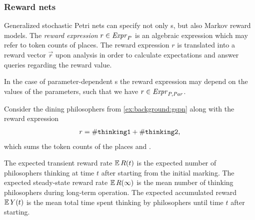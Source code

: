 \subsubsection{Reward nets}

Generalized stochastic Petri nets can specify not only s, but also Markov reward models. The \emph{reward expression} \(r \in \textrm{\itshape Expr\/}_P\) is an algebraic expression which may refer to token counts of places. The reward expression \(r\) is translated into a reward vector \(\vec{r}\) upon analysis in order to calculate expectations and answer queries regarding the reward value.

In the case of parameter-dependent s the reward expression may depend on the values of the parameters, such that we have \(r \in \textrm{\itshape Expr\/}_{P, \textrm{\itshape Par\/}}\).

\begin{runningExample}
  Consider the dining philosophers  from \vref{ex:background:gspn} along with the reward expression
  \begin{equation}
    r = \#\texttt{\upshape thinking1} + \#\texttt{\upshape thinking2} \text,
  \end{equation}
  which sums the token counts of the places  and .

  The expected transient reward rate \(\operatorname{\mathbb{E}} R(t)\) is the expected number of philosophers thinking at time \(t\) after starting from the initial marking. The expected steady-state reward rate \(\operatorname{\mathbb{E}} R(\infty)\) is the mean number of thinking philosophers during long-term operation. The expected accumulated reward \(\operatorname{\mathbb{E}} Y(t)\) is the mean total time spent thinking by philosophers until time \(t\) after starting.
\end{runningExample}

